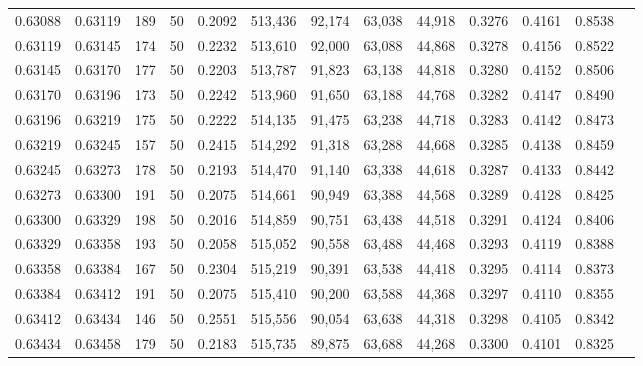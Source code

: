\begin{tabular}{rrrrrrrrrrrrr}
0.63088 & 0.63119 &   189 &  50 &                                     0.2092 & 513,436 &  92,174 &  63,038 &  44,918 & 0.3276 & 0.4161 & 0.8538 \\
0.63119 & 0.63145 &   174 &  50 &                                     0.2232 & 513,610 &  92,000 &  63,088 &  44,868 & 0.3278 & 0.4156 & 0.8522 \\
0.63145 & 0.63170 &   177 &  50 &                                     0.2203 & 513,787 &  91,823 &  63,138 &  44,818 & 0.3280 & 0.4152 & 0.8506 \\
0.63170 & 0.63196 &   173 &  50 &                                     0.2242 & 513,960 &  91,650 &  63,188 &  44,768 & 0.3282 & 0.4147 & 0.8490 \\
0.63196 & 0.63219 &   175 &  50 &                                     0.2222 & 514,135 &  91,475 &  63,238 &  44,718 & 0.3283 & 0.4142 & 0.8473 \\
0.63219 & 0.63245 &   157 &  50 &                                     0.2415 & 514,292 &  91,318 &  63,288 &  44,668 & 0.3285 & 0.4138 & 0.8459 \\
0.63245 & 0.63273 &   178 &  50 &                                     0.2193 & 514,470 &  91,140 &  63,338 &  44,618 & 0.3287 & 0.4133 & 0.8442 \\
0.63273 & 0.63300 &   191 &  50 &                                     0.2075 & 514,661 &  90,949 &  63,388 &  44,568 & 0.3289 & 0.4128 & 0.8425 \\
0.63300 & 0.63329 &   198 &  50 &                                     0.2016 & 514,859 &  90,751 &  63,438 &  44,518 & 0.3291 & 0.4124 & 0.8406 \\
0.63329 & 0.63358 &   193 &  50 &                                     0.2058 & 515,052 &  90,558 &  63,488 &  44,468 & 0.3293 & 0.4119 & 0.8388 \\
0.63358 & 0.63384 &   167 &  50 &                                     0.2304 & 515,219 &  90,391 &  63,538 &  44,418 & 0.3295 & 0.4114 & 0.8373 \\
0.63384 & 0.63412 &   191 &  50 &                                     0.2075 & 515,410 &  90,200 &  63,588 &  44,368 & 0.3297 & 0.4110 & 0.8355 \\
0.63412 & 0.63434 &   146 &  50 &                                     0.2551 & 515,556 &  90,054 &  63,638 &  44,318 & 0.3298 & 0.4105 & 0.8342 \\
0.63434 & 0.63458 &   179 &  50 &                                     0.2183 & 515,735 &  89,875 &  63,688 &  44,268 & 0.3300 & 0.4101 & 0.8325 \\

\end{tabular}
